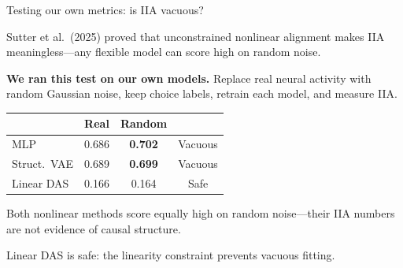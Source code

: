 \documentclass[aspectratio=169,11pt]{beamer}
\begin{document}
\begin{frame}{Testing our own metrics: is IIA vacuous?}

Sutter et al.\ (2025) proved that unconstrained nonlinear alignment makes IIA meaningless---any flexible model can score high on random noise.

\vspace{0.5em}
\textbf{We ran this test on our own models.} Replace real neural activity with random Gaussian noise, keep choice labels, retrain each model, and measure IIA.

\vspace{0.5em}
\centering
{\small
\begin{tabular}{lccc}
\toprule
 & \textbf{Real} & \textbf{Random} & \\
\midrule
MLP & 0.686 & \textcolor{fail}{\textbf{0.702}} & \textcolor{fail}{Vacuous} \\
Struct.\ VAE & 0.689 & \textcolor{fail}{\textbf{0.699}} & \textcolor{fail}{Vacuous} \\
Linear DAS & 0.166 & \textcolor{pass}{0.164} & \textcolor{pass}{Safe} \\
\bottomrule
\end{tabular}
}

\vspace{0.5em}
\begin{flushleft}
Both nonlinear methods score equally high on random noise---their IIA numbers are not evidence of causal structure.

Linear DAS is safe: the linearity constraint prevents vacuous fitting.
\end{flushleft}
\end{frame}
\end{document}
